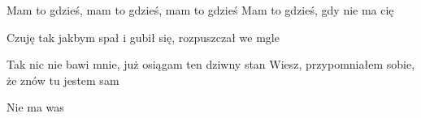 \documentclass[../../../songbook.tex]{subfiles}
\begin{document}
\-\hspace{1cm} Mam to gdzieś, mam to gdzieś, mam to gdzieś		 \newline	
\-\hspace{1cm} Mam to gdzieś, gdy nie ma cię					 \newline	

Czuję tak jakbym spał i gubił się, rozpuszczał we mgle	 \newline	

\-\hspace{1cm} Tak nic nie bawi mnie, już osiągam ten dziwny stan	 \newline	
\-\hspace{1cm} Wiesz, przypomniałem sobie, że znów tu jestem sam	 \newline	

Nie ma was	 \newline	
\end{document}
